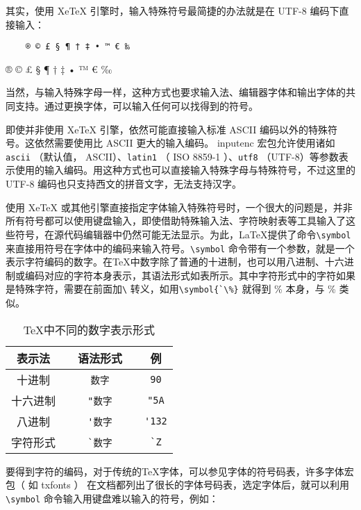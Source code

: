 其实，使用 XeTeX 引擎时，输入特殊符号最简捷的办法就是在 UTF-8 编码下直接输入：

\begin{minipage}[t]{0.45\textwidth}
\begin{lstlisting}
    ® © £ § ¶ † ‡ • ™ € ‰
\end{lstlisting}
\end{minipage}
\hfill
\begin{minipage}[t]{0.45\textwidth}
    ® © £ § ¶ † ‡ • ™ € ‰
\end{minipage}

当然，与输入特殊字母一样，这种方式也要求输入法、编辑器字体和输出字体的共同支持。通过更换字体，可以输入任何可以找得到的符号。

即使并非使用 XeTeX 引擎，依然可能直接输入标准 ASCII 编码以外的特殊符号。这依然需要使用比 ASCII 更大的输入编码。 inputenc 宏包允许使用诸如 \verb|ascii| （默认值， ASCII）、\verb|latin1| （ ISO 8859-1 ）、\verb|utf8| （UTF-8）等参数表示使用的输入编码。用这种方式也可以直接输入特殊字母与特殊符号，不过这里的 UTF-8 编码也只支持西文的拼音文字，无法支持汉字。

使用 XeTeX 或其他引擎直接指定字体输入特殊符号时，一个很大的问题是，并非所有符号都可以使用键盘输入，即使借助特殊输入法、字符映射表等工具输入了这些符号，在源代码编辑器中仍然可能无法显示。为此，\LaTeX 提供了命令\verb|\symbol| 来直接用符号在字体中的编码来输入符号。\verb|\symbol| 命令带有一个参数，就是一个表示字符编码的数字。在\TeX 中数字除了普通的十进制，也可以用八进制、十六进制或编码对应的字符本身表示，其语法形式如表所示。其中字符形式中的字符如果是特殊字符，需要在前面加\verb|\| 转义，如用\verb|\symbol{`\%}| 就得到 \% 本身，与 \% 类似。

\begin{table}[H]
    \centering
    \caption{\TeX 中不同的数字表示形式}
    \label{tab:number}
    \begin{tabular}{ccccc}
        \toprule
        表示法 && 语法形式 && 例 \\ 
        \midrule
        十进制 && \verb|数字| && \verb|90| \\ 
        十六进制 && \verb|"数字| && \verb|"5A| \\ 
        八进制 && \verb|'数字| && \verb|'132| \\ 
        字符形式 && \verb|`数字| && \verb|`Z| \\
        \bottomrule
    \end{tabular}
\end{table}

要得到字符的编码，对于传统的\TeX 字体，可以参见字体的符号码表，许多字体宏包（ 如 txfonts ） 在文档都列出了很长的字体号码表，选定字体后，就可以利用\verb|\symbol| 命令输入用键盘难以输入的符号，例如：

